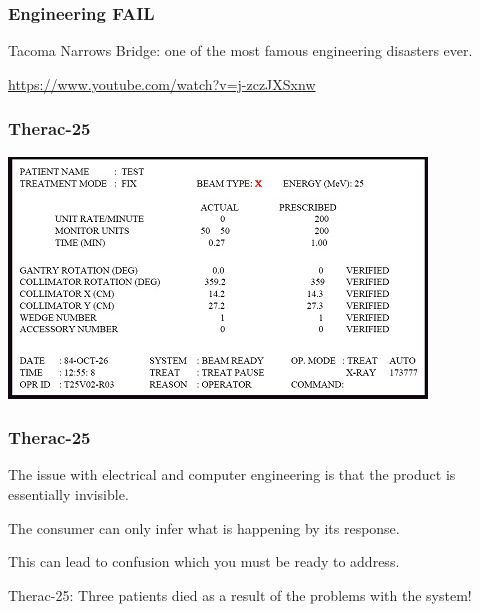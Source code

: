 \begin{frame}
\frametitle{Engineering FAIL}



Tacoma Narrows Bridge: one of the most famous engineering disasters ever.

\begin{center}
	\url{https://www.youtube.com/watch?v=j-zczJXSxnw}
\end{center}

\end{frame}



\begin{frame}
\frametitle{Therac-25}

\begin{center}
    \includegraphics[width=.8\linewidth]{images/Xraybad}
\end{center}

\end{frame}



\begin{frame}
\frametitle{Therac-25}

The issue with electrical and computer engineering is that the product is essentially invisible.

The consumer can only infer what is happening by its response.

This can lead to confusion which you must be ready to address.

Therac-25: Three patients died as a result of the problems with the system!

\end{frame}



